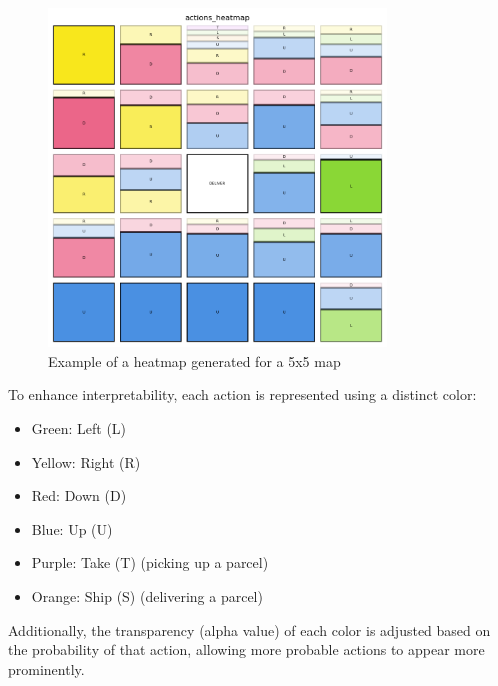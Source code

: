 \begin{figure}[ht!]
  \centering
  \includegraphics[width=0.8\textwidth]{
    images/data_collection/heatmap_example.png
  }
  \caption{Example of a heatmap generated for a 5x5 map}
  \label{fig:heatmap_example}
\end{figure}

To enhance interpretability, each action is represented using a distinct color:
\begin{itemize}
  \item Green: Left (L)

  \item Yellow: Right (R)

  \item Red: Down (D)

  \item Blue: Up (U)

  \item Purple: Take (T) (picking up a parcel)

  \item Orange: Ship (S) (delivering a parcel)
\end{itemize}
Additionally, the transparency (alpha value) of each color is adjusted based on the
probability of that action, allowing more probable actions to appear more
prominently.

